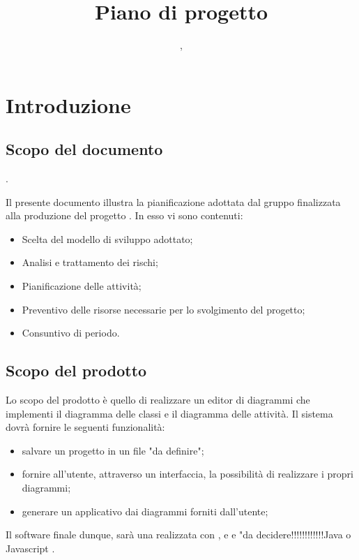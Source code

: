 

\author{\LB, \PB}
\supervisor{\GG, \MM}
\title{Piano di progetto}

\renewcommand{\arraystretch}{1.5}
\setcounter{tocdepth}{4}
\setcounter{secnumdepth}{4}


\maketitle

\tableofcontents
\newpage

\section{Introduzione}
	\subsection{Scopo del documento}.

	Il presente documento illustra la pianificazione adottata dal gruppo {\hx} finalizzata alla produzione del progetto {\proj}. In esso vi sono contenuti:
\begin{itemize}
	\item Scelta del modello di sviluppo adottato;
	\item Analisi e trattamento dei rischi;
	\item Pianificazione delle attività;
	\item Preventivo delle risorse necessarie per lo svolgimento del progetto;
    \item Consuntivo di periodo.
\end{itemize}

	\subsection{Scopo del prodotto}
	Lo scopo del prodotto è quello di realizzare un editor di diagrammi  che implementi il diagramma delle classi e il diagramma delle attività.
	Il sistema dovrà fornire le seguenti funzionalità:
	\begin{itemize}
		\item salvare un progetto in un file "da definire";
		\item fornire all'utente, attraverso un interfaccia, la possibilità di realizzare i propri diagrammi;
		\item generare un applicativo  dai diagrammi forniti dall'utente;
	\end{itemize}
	Il software finale dunque, sarà una  realizzata con ,  e   e
	"da decidere!!!!!!!!!!!!Java o Javascript .
	
